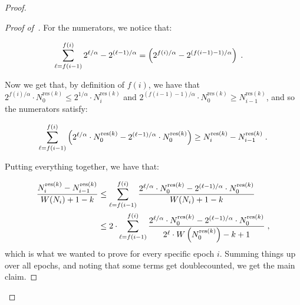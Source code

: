\documentclass[sigconf]{acmart}
\begin{document}
\begin{proof}
\begin{proof}[Proof of~]
\noindent
For the numerators, we notice that:

\begin{align*}
\sum_{\ell=f(i-1)}^{f(i)} 2^{\ell/\alpha}  - 2^{(\ell-1)/\alpha} 
&= \left(2^{f(i)/\alpha} - 2^{(f(i-1)-1)/\alpha} \right)  \;.
\end{align*}

Now we get that, by definition of $f(i)$, we have that
$2^{f(i)/\alpha}\cdot N^{\text{res}(k)}_0 \leq 2^{1/\alpha} \cdot N^{\text{res}(k)}_i$ and $2^{(f(i-1)-1)/\alpha}\cdot N^{\text{res}(k)}_0 \geq N^{\text{res}(k)}_{i-1}$, and so the numerators satisfy:

$$ \sum_{\ell=f(i-1)}^{f(i)} \left(2^{\ell/\alpha} \cdot N^{\text{res}(k)}_0 - 2^{(\ell-1)/\alpha} \cdot N^{\text{res}(k)}_0\right) \geq N^{\text{res}(k)}_{i}- N^{\text{res}(k)}_{i-1} \;.$$ 

Putting everything together, we have that:

\begin{align*}
\frac{N^{\text{res}(k)}_{i}- N^{\text{res}(k)}_{i-1}}{W(N_i)+1-k} & \leq 
\sum_{\ell=f(i-1)}^{f(i)} \frac{2^{\ell/\alpha} \cdot N^{\text{res}(k)}_0 - 2^{(\ell-1)/\alpha} \cdot N^{\text{res}(k)}_0}{W(N_i)+1-k}\\
&\leq 2 \cdot  \sum_{\ell=f(i-1)}^{f(i)} \frac{2^{\ell/\alpha} \cdot N^{\text{res}(k)}_0 - 2^{(\ell-1)/\alpha} \cdot N^{\text{res}(k)}_0}{2^{\ell} \cdot W\left(N^{\text{res}(k)}_0 \right)-k+1} \;,
\end{align*}
which is what we wanted to prove for every specific epoch $i$. Summing things up over all epochs, and noting that some terms get doublecounted, we get the main claim.

\end{proof}	
\end{proof}
\end{document}
